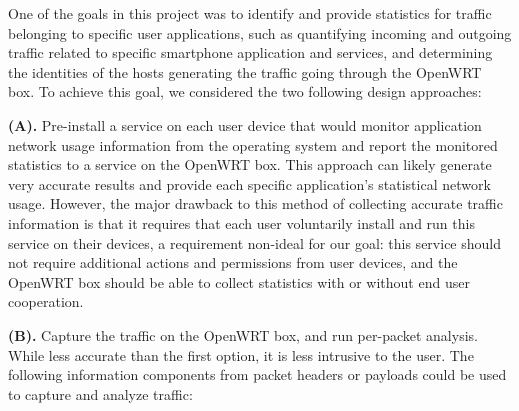 One of the goals in this project was to identify and provide statistics for traffic belonging to specific user applications, such as quantifying incoming and outgoing traffic related to specific smartphone application and services, and determining the identities of the hosts generating the traffic going through the OpenWRT box. To achieve this goal, we considered the two following design approaches:

\textbf{(A).} Pre-install a service on each user device that would monitor application network usage information from the operating system and report the monitored statistics to a service on the OpenWRT box. This approach can likely generate very accurate results and provide each specific application's statistical network usage. However, the major drawback to this method of collecting accurate traffic information is that it requires that each user voluntarily install and run this service on their devices, a requirement non-ideal for our goal: this service should not require additional actions and permissions from user devices, and the OpenWRT box should be able to collect statistics with or without end user cooperation.
	
\textbf{(B).}  Capture the traffic on the OpenWRT box, and run per-packet analysis. While less accurate than the first option, it is less intrusive to the user. The following information components from packet headers or payloads could be used to capture and analyze traffic:
	
